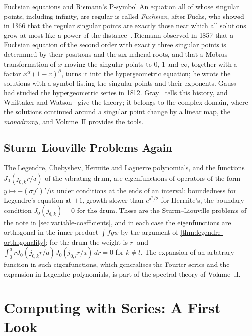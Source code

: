 \begin{note}{Fuchsian equations and Riemann's P-symbol}
An equation all of whose singular points, including infinity, are regular is called \emph{Fuchsian}, after Fuchs, who showed in 1866 that the regular singular points are exactly those near which all solutions grow at most like a power of the distance~\cite{fuchs1866}. Riemann observed in 1857 that a Fuchsian equation of the second order with exactly three singular points is determined by their positions and the six indicial roots, and that a M\"obius transformation of $x$ moving the singular points to $0$, $1$ and $\infty$, together with a factor $x^\alpha(1-x)^\beta$, turns it into the hypergeometric equation; he wrote the solutions with a symbol listing the singular points and their exponents. Gauss had studied the hypergeometric series in 1812. Gray~\cite{gray2000} tells this history, and Whittaker and Watson~\cite[Chaps.~X and~XIV]{whittaker1927} give the theory; it belongs to the complex domain, where the solutions continued around a singular point change by a linear map, the \emph{monodromy}, and Volume~II provides the tools.
\end{note}

\subsection{Sturm--Liouville Problems Again}

The Legendre, Chebyshev, Hermite and Laguerre polynomials, and the functions $J_0(j_{0,k}r/a)$ of the vibrating drum, are eigenfunctions of operators of the form $y\mapsto-(\sigma y')'/w$ under conditions at the ends of an interval: boundedness for Legendre's equation at $\pm1$, growth slower than $e^{x^2/2}$ for Hermite's, the boundary condition $J_0(j_{0,k})=0$ for the drum. These are the Sturm--Liouville problems of the note in \cref{sec:variable-coefficients}, and in each case the eigenfunctions are orthogonal in the inner product $\int fgw$ by the argument of \cref{thm:legendre-orthogonality}; for the drum the weight is $r$, and $\int_0^arJ_0(j_{0,k}r/a)J_0(j_{0,l}r/a)\,dr=0$ for $k\ne l$. The expansion of an arbitrary function in such eigenfunctions, which generalises the Fourier series and the expansion in Legendre polynomials, is part of the spectral theory of Volume~II.

\section{Computing with Series: A First Look}
\label{sec:series-computation}

